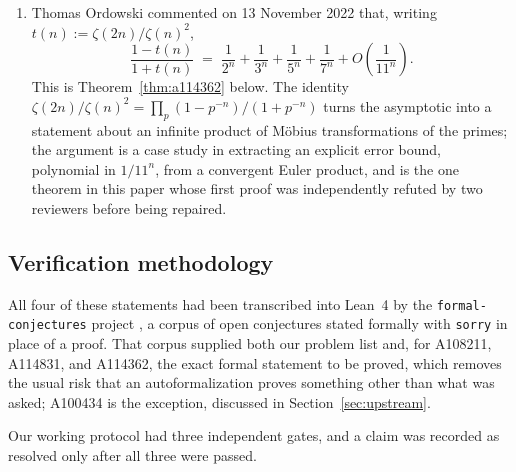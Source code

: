 \documentclass[11pt]{article}
\theoremstyle{plain}
\theoremstyle{definition}
\theoremstyle{remark}
\numberwithin{equation}{section}
\begin{document}
\begin{enumerate}
\item[(A114362)] Thomas Ordowski commented on 13 November 2022 \cite{ordowski} that, writing
$t(n) := \zeta(2n)/\zeta(n)^2$,
\[
  \frac{1-t(n)}{1+t(n)} \;=\; \frac{1}{2^n} + \frac{1}{3^n} + \frac{1}{5^n} + \frac{1}{7^n}
    + O\!\left(\frac{1}{11^n}\right).
\]
This is Theorem~\ref{thm:a114362} below. The identity
$\zeta(2n)/\zeta(n)^2 = \prod_p (1-p^{-n})/(1+p^{-n})$ turns the asymptotic into a statement about
an infinite product of M\"obius transformations of the primes; the argument is a case study in
extracting an explicit error bound, polynomial in $1/11^n$, from a convergent Euler product, and
is the one theorem in this paper whose first proof was independently refuted by two reviewers
before being repaired.
\end{enumerate}

\subsection{Verification methodology}

All four of these statements had been transcribed into Lean~4 by the
\texttt{formal-conjectures} project \cite{formalconjectures}, a corpus of open conjectures
stated formally with \texttt{sorry} in place of a proof. That corpus supplied both our problem
list and, for A108211, A114831, and A114362, the exact formal statement to be proved, which
removes the usual risk that an autoformalization proves something other than what was asked;
A100434 is the exception, discussed in Section~\ref{sec:upstream}.

Our working protocol had three independent gates, and a claim was recorded as resolved only
after all three were passed.
\end{document}
